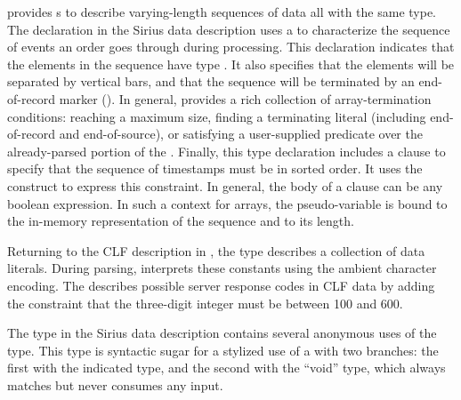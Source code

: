 \documentclass{sig-alternate}
\newcommand{\dibbler}{Sirius}
\begin{document}
\pads{} provides s to describe varying-length sequences of data all 
with the same type.  The  declaration in the \dibbler{} data description
uses a  to characterize the sequence of events an
order goes through during processing.  This declaration indicates that the elements
in the sequence have type .  It also specifies that the elements will
be separated by vertical bars, and that the sequence will be terminated by 
an end-of-record marker ().  In general, \pads{} provides a rich collection
of array-termination conditions: reaching a maximum size, finding a terminating
literal (including end-of-record and end-of-source),
or satisfying a user-supplied predicate over the already-parsed portion of 
the .  Finally, this type declaration includes a  clause
to specify that the sequence of timestamps must be in sorted order.
It uses the  construct to express this constraint.
In general, the body of a  clause can be any boolean expression.
In such a context for arrays, the pseudo-variable  is bound to the in-memory representation of the sequence and  to its length.

Returning to the CLF description in , the  type  describes
a collection of data literals.  During parsing, \pads{} interprets these
constants using the ambient character encoding.  The  
 describes possible server response codes in CLF data by adding
the constraint that the three-digit integer must be between 100 and 600.

The  type in the \dibbler{} data description contains several
anonymous uses of the  type.  This type is syntactic sugar for a 
stylized use of a  with two branches: the first with the indicated type, and the second with the ``void'' type, which  
always matches but never consumes any input.

\setlength{\floatsep}{0pt}
\setlength{\dblfloatsep}{0pt}
\setcounter{totalnumber}{4}
\setcounter{dbltopnumber}{2}
\begin{figure*}[t!]
\end{figure*}
\end{document}
